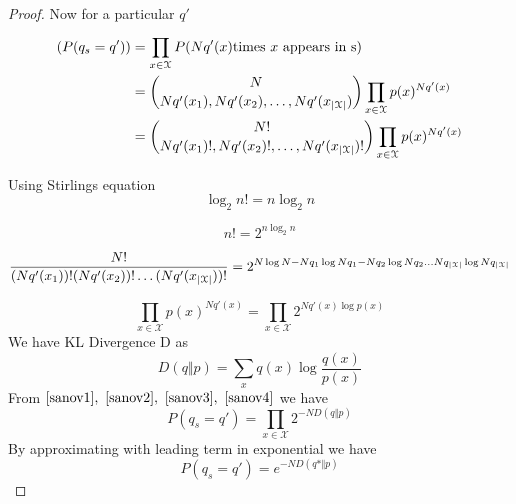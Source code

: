 \documentclass[letterpaper,english,10pt]{article}
\begin{document}
\begin{proof} 
  Now for a particular $q'$ 
  \begin{equation} \label{sanov1}
  \begin{split}
      (P(q_{s}=q')) & =  \prod_{x\in \mathcal{X}}^{} P(Nq'(x) \text{times $x$ appears in s)}\\
      & ={N \choose Nq'(x_1), Nq'(x_2), \dots, Nq'(x_{\left\lvert\mathcal{X}\right\rvert})} \prod_{x \in \mathcal{X}} p(x)^{Nq'(x)}\\
      & ={N! \choose{Nq'(x_1)}!,Nq'(x_2)!,\dots,Nq'(x_{\left\lvert\mathcal{X}\right\rvert})!} \prod_{x \in \mathcal{X}} p(x)^{Nq'(x)}\\
  \end{split}
  \end{equation}
  
  Using Stirlings equation 
  \begin{equation}
  \log_2 n! = n \log_2 n
  \end{equation}
  
  \begin{equation}
    n! = 2^{n\log_2 n} \label{sanov2}
  \end{equation}
  
  
  \begin{equation} \label{sanov3}
  \dfrac{N!}{(Nq'(x_1))! (Nq'(x_2))! \dots (Nq'(x_{\left\lvert\mathcal{X}\right\rvert}))!} 
  =  2^{N\log N - Nq_1\log{Nq_1} - Nq_2\log{Nq_2} \dots Nq_{\left\lvert\mathcal{X}\right\rvert} \log{Nq_{\left\lvert\mathcal{X}\right\rvert}}}
  \end{equation}
  
  \begin{equation} \label{sanov4}
      \prod_{x \in \mathcal{X}} p(x)^{Nq'(x)}= \prod_{x \in \mathcal{X}} 2^{Nq'(x)\log p(x)}
  \end{equation}
  We have KL Divergence D as 
  \begin{equation}
      D(q \Vert p) = \sum_{x}{}q(x)\log \dfrac{q(x)}{p(x)}
  \end{equation}
  From $\ref{sanov1},~\ref{sanov2},~\ref{sanov3},~\ref{sanov4}$ we have
  \begin{equation}
      P(q_{s}=q') = \prod_{x\in \mathcal{X}}2^{-ND(q \Vert p)}
  \end{equation}
  By approximating with leading term in exponential
  we have 
  \begin{equation}
       P(q_{s}=q') = e^{-ND(q* \Vert p)}
  \end{equation}
  \end{proof}
  
\end{document}
